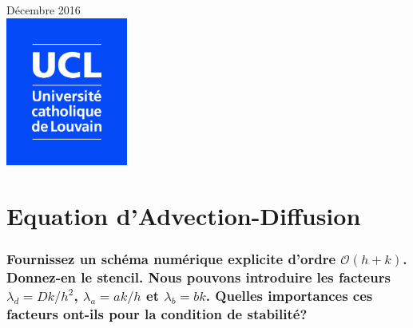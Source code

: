 \documentclass[a4paper, 12pt]{report}
\begin{document}
\begin{titlepage}


{\large Décembre 2016}\\[1.5cm] %


\includegraphics[width=4cm]{Logo_UCL_SCIENCES.jpg}\\[1cm] %


\vfill %

\end{titlepage}

\part{Equation d'Advection-Diffusion}



\section{Fournissez un schéma numérique explicite d'ordre $\mathcal{O}(h+k)$.
Donnez-en le stencil. Nous pouvons introduire les facteurs $\lambda_d = Dk/h^2$,
$\lambda_a = ak/h$ et $\lambda_b = bk$. Quelles importances ces facteurs
 ont-ils pour la condition de stabilité?}
\end{document}

